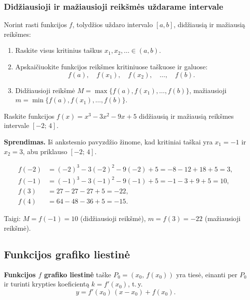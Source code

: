 \subsubsection*{Didžiausioji ir mažiausioji reikšmės uždarame intervale}

Norint rasti funkcijos $f$, tolydžios uždaro intervalo $[a,b]$, didžiausią
ir mažiausią reikšmes:

\begin{enumerate}
  \item Raskite visus kritinius taškus $x_1, x_2, \ldots \in (a,b)$.
  \item Apskaičiuokite funkcijos reikšmes kritiniuose taškuose ir galuose:
        \[
          f(a),\quad f(x_1),\quad f(x_2),\quad \ldots,\quad f(b).
        \]
  \item Didžiausioji reikšmė $M = \max\bigl\{f(a),f(x_1),\ldots,f(b)\bigr\}$,
        mažiausioji $m = \min\bigl\{f(a),f(x_1),\ldots,f(b)\bigr\}$.
\end{enumerate}

\begin{example}
Raskite funkcijos $f(x) = x^3 - 3x^2 - 9x + 5$ didžiausią ir mažiausią
reikšmes intervale $[-2;\,4]$.

\textbf{Sprendimas.}
Iš ankstesnio pavyzdžio žinome, kad kritiniai taškai yra $x_1=-1$ ir
$x_2=3$, abu priklauso $[-2;\,4]$.

\begin{align*}
  f(-2) &= (-2)^3 - 3(-2)^2 - 9(-2)+5 = -8-12+18+5 = 3,\\
  f(-1) &= (-1)^3 - 3(-1)^2 - 9(-1)+5 = -1-3+9+5 = 10,\\
  f(3)  &= 27 - 27 - 27 + 5 = -22,\\
  f(4)  &= 64 - 48 - 36 + 5 = -15.
\end{align*}

Taigi: $M = f(-1) = 10$ (didžiausioji reikšmė),
$m = f(3) = -22$ (mažiausioji reikšmė).
\end{example}

\subsection{Funkcijos grafiko liestinė}

\begin{definition}
\textbf{Funkcijos $f$ grafiko liestinė} taške $P_0 = (x_0,\, f(x_0))$
yra tiesė, einanti per $P_0$ ir turinti krypties koeficientą
$k = f'(x_0)$, t.\,y.
\[
  y = f'(x_0)\,(x - x_0) + f(x_0).
\]
\end{definition}

